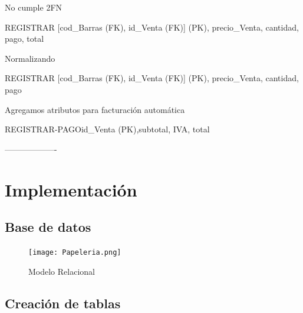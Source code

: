 \documentclass[30pt,fleqn]{article}
\begin{document}
\vspace{10mm} %
No cumple 2FN
\vspace{10mm} %

REGISTRAR {[cod_Barras (FK), id_Venta (FK)] (PK), precio_Venta, cantidad, pago, total}

\vspace{10mm} %

Normalizando

 \vspace{10mm} %

REGISTRAR {[cod_Barras (FK), id_Venta (FK)] (PK), precio_Venta, cantidad, pago}


\vspace{10mm} %

Agregamos atributos para facturación automática

\vspace{10mm} %

REGISTRAR-PAGO{id_Venta (PK),subtotal, IVA, total}



-------------------

\newpage
\section{Implementación}

\subsection{Base de datos}

\begin{figure}[h]
    \centering
    \texttt{[image: Papeleria.png]}
    \caption{Modelo Relacional}
    \label{fig:Modelo Relacional}
\end{figure}
\vspace{5mm} %


\newpage
\subsection{Creación de tablas}


\end{document}

